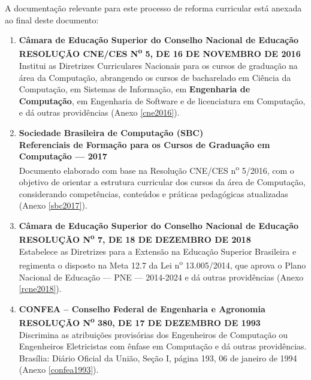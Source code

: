 A documentação relevante para este processo de reforma curricular está anexada ao final deste documento:

\begin{enumerate}
    \item \textbf{Câmara de Educação Superior do Conselho Nacional de Educação}  \\
          \textbf{RESOLUÇÃO CNE/CES N\textsuperscript{o} 5, DE 16 DE NOVEMBRO DE 2016}  \\
          Institui as Diretrizes Curriculares Nacionais para os cursos de graduação na área da Computação, abrangendo os cursos de bacharelado em Ciência da Computação, em Sistemas de Informação, em \textbf{Engenharia de Computação}, em Engenharia de Software e de licenciatura em Computação, e dá outras providências (Anexo \ref{cne2016}).

    \item \textbf{Sociedade Brasileira de Computação (SBC)}  \\
          \textbf{Referenciais de Formação para os Cursos de Graduação em Computação –-- 2017} \\
          Documento elaborado com base na Resolução CNE/CES n\textsuperscript{o} 5/2016, com o objetivo de orientar a estrutura curricular dos cursos da área de Computação, considerando competências, conteúdos e práticas pedagógicas atualizadas (Anexo \ref{sbc2017}).

    \item \textbf{Câmara de Educação Superior do Conselho Nacional de Educação}  \\
          \textbf{RESOLUÇÃO N\textsuperscript{o} 7, DE 18 DE DEZEMBRO DE 2018}  \\
          Estabelece as Diretrizes para a Extensão na Educação Superior Brasileira e regimenta o disposto na Meta 12.7 da Lei n\textsuperscript{o} 13.005/2014, que aprova o Plano Nacional de Educação –-- PNE –-- 2014-2024 e dá outras providências (Anexo \ref{rcne2018}).

    \item \textbf{CONFEA – Conselho Federal de Engenharia e Agronomia} \\
          \textbf{RESOLUÇÃO N\textsuperscript{o} 380, DE 17 DE DEZEMBRO DE 1993}  \\
          Discrimina as atribuições provisórias dos Engenheiros de Computação ou Engenheiros Eletricistas com ênfase em Computação e dá outras providências. Brasília: Diário Oficial da União, Seção I, página 193, 06 de janeiro de 1994 (Anexo \ref{confea1993}).
\end{enumerate}


